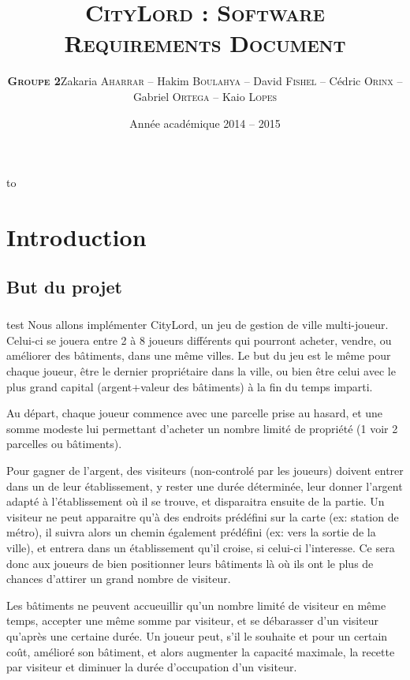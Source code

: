 \documentclass[a4paper,11pt]{report}
\date{Année académique 2014 – 2015}
\title{ \textsc{CityLord} :
\textsc{Software Requirements Document}\\}
\author{\textsc{\textbf{Groupe 2}}\newline Zakaria \textsc{Aharrar} – Hakim \textsc{Boulahya} – David \textsc{Fishel} – Cédric \textsc{Orinx} – Gabriel \textsc{Ortega} – Kaio \textsc{Lopes}}
\makeatletter
\def\clap#1{\hbox to 0pt{\hss #1\hss}}%
\def\haut#1#2#3{%
\hbox to \hsize{%
\rlap{\vtop{\centering #1}}%
\hss
\clap{\vtop{\centering #2}}%
\hss
\llap{\vtop{\centering #3}}}}%
\def\bas#1#2#3{%
\hbox to \hsize{%
\rlap{\vbox{\centering #1}}%
\hss
\clap{\vbox{\centering #2}}%
\hss
\llap{\vbox{\centering #3}}}}%
\def\maketitle{%
\thispagestyle{empty}\vbox to \vsize{%
\haut{}{\@blurb}{}
\vfill
\vspace{1cm}
\begin{flushleft}
\usefont{OT1}{ptm}{m}{n}
\huge \@title
\end{flushleft}
\par
\hrule height 4pt
\par
\begin{flushright}
\usefont{OT1}{phv}{m}{n}
\Large \@author
\par
\end{flushright}
\vspace{1cm}
\vfill
\vfill
\bas{}{\@date}{}
}%
\cleardoublepage
}
\makeatother
\begin{document}
\maketitle
\tableofcontents
\clearpage

\chapter{Introduction}
\section{But du projet}
\paragraph{}test
Nous allons implémenter CityLord, un jeu de gestion de ville multi-joueur.
Celui-ci se jouera entre 2 à 8 joueurs différents qui pourront acheter, vendre, ou améliorer des bâtiments, dans une même villes.
Le but du jeu est le même pour chaque joueur, être le dernier propriétaire dans la ville, ou bien être celui avec le plus grand capital (argent+valeur des bâtiments) à la fin du temps imparti.

Au départ, chaque joueur commence avec une parcelle prise au hasard, et une somme modeste lui permettant d'acheter un nombre limité de propriété (1 voir 2 parcelles ou bâtiments).

Pour gagner de l'argent, des visiteurs (non-controlé par les joueurs) doivent entrer dans un de leur établissement, y rester une durée déterminée, leur donner l'argent adapté à l'établissement où il se trouve, et disparaitra ensuite de la partie.
Un visiteur ne peut apparaitre qu'à des endroits prédéfini sur la carte (ex: station de métro), il suivra alors un chemin également prédéfini (ex: vers la sortie de la ville), et entrera dans un établissement qu'il croise, si celui-ci l'interesse.
Ce sera donc aux joueurs de bien positionner leurs bâtiments là où ils ont le plus de chances d'attirer un grand nombre de visiteur.

Les bâtiments ne peuvent accueuillir qu'un nombre limité de visiteur en même temps, accepter une même somme par visiteur, et se débarasser d'un visiteur qu'après une certaine durée.
Un joueur peut, s'il le souhaite et pour un certain coût, amélioré son bâtiment, et alors augmenter la capacité maximale, la recette par visiteur et diminuer la durée d'occupation d'un visiteur.
\end{document}

